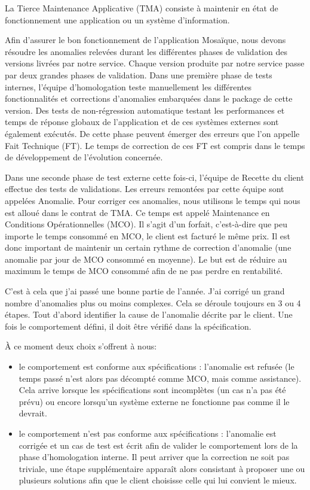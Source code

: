 La Tierce Maintenance Applicative (TMA) consiste à maintenir en état de fonctionnement une application ou un système d'information.

Afin d'assurer le bon fonctionnement de l'application Mosaïque, nous devons résoudre les anomalies relevées durant les différentes phases de validation des versions livrées par notre service. Chaque version produite par notre service passe par deux grandes phases de validation. 
Dans une première phase de tests internes, l'équipe d'homologation  teste manuellement les différentes fonctionnalités et corrections d'anomalies embarquées dans le package de cette version. Des tests de non-régression automatique testant les performances et temps de réponse globaux de l'application et de ces systèmes externes sont également exécutés. De cette phase peuvent émerger des erreurs que l'on appelle Fait Technique (FT). Le temps de correction de ces FT est compris dans le temps de développement de l'évolution concernée.

Dans une seconde phase de test externe cette fois-ci, l'équipe de Recette du client effectue des tests de validations. Les erreurs remontées par cette équipe sont appelées Anomalie. Pour corriger ces anomalies, nous utilisons le temps qui nous est alloué dans le contrat de TMA. Ce temps est appelé Maintenance en Conditions Opérationnelles (MCO). Il s'agit d'un forfait, c'est-à-dire que peu importe le temps consommé en MCO, le client est facturé le même prix. Il est donc important de maintenir un certain rythme de correction d'anomalie (une anomalie par jour de MCO consommé en moyenne). Le but est de réduire au maximum le temps de MCO consommé afin de ne pas perdre en rentabilité.

C'est à cela que j'ai passé une bonne partie de l'année. J'ai corrigé un grand nombre d'anomalies plus ou moins complexes. Cela se déroule toujours en 3 ou 4 étapes. Tout d'abord identifier la cause de l'anomalie décrite par le client. Une fois le comportement défini, il doit être vérifié dans la spécification.

À ce moment deux choix s'offrent à nous: 

\begin{itemize}
    \item le comportement est conforme aux spécifications : l’anomalie est refusée (le temps passé n'est alors pas décompté comme MCO, mais comme assistance). Cela arrive lorsque les spécifications sont incomplètes (un cas n'a pas été prévu) ou encore lorsqu'un système externe ne fonctionne pas comme il le devrait. 
    \item le comportement n'est pas conforme aux spécifications : l’anomalie est corrigée et un cas de test est écrit afin de valider le comportement lors de la phase d'homologation interne.
    Il peut arriver que la correction ne soit pas triviale, une étape supplémentaire apparaît alors consistant à proposer une ou plusieurs solutions afin que le client choisisse celle qui lui convient le mieux.
\end{itemize}
